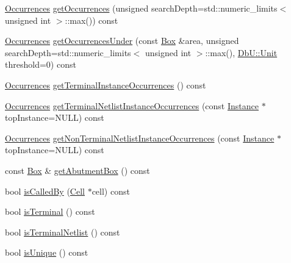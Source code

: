 \begin{DoxyCompactItemize}
\mbox{\hyperlink{namespaceHurricane_a1912927c128eee859af62dbe4cbe0a6b}{Occurrences}} \mbox{\hyperlink{classHurricane_1_1Cell_ab5bbab0a59106855d61deb94805e6115}{get\+Occurrences}} (unsigned search\+Depth=std\+::numeric\+\_\+limits$<$ unsigned int $>$\+::max()) const
\item 
\mbox{\hyperlink{namespaceHurricane_a1912927c128eee859af62dbe4cbe0a6b}{Occurrences}} \mbox{\hyperlink{classHurricane_1_1Cell_aee27efc0497992f811c9812ffa272a5a}{get\+Occurrences\+Under}} (const \mbox{\hyperlink{classHurricane_1_1Box}{Box}} \&area, unsigned search\+Depth=std\+::numeric\+\_\+limits$<$ unsigned int $>$\+::max(), \mbox{\hyperlink{group__DbUGroup_ga4fbfa3e8c89347af76c9628ea06c4146}{Db\+U\+::\+Unit}} threshold=0) const
\item 
\mbox{\hyperlink{namespaceHurricane_a1912927c128eee859af62dbe4cbe0a6b}{Occurrences}} \mbox{\hyperlink{classHurricane_1_1Cell_a30b71d9a35ff4e0b59b98ef515f26fc0}{get\+Terminal\+Instance\+Occurrences}} () const
\item 
\mbox{\hyperlink{namespaceHurricane_a1912927c128eee859af62dbe4cbe0a6b}{Occurrences}} \mbox{\hyperlink{classHurricane_1_1Cell_a6f559f7dab6e4afc0b60eba064c5e474}{get\+Terminal\+Netlist\+Instance\+Occurrences}} (const \mbox{\hyperlink{classHurricane_1_1Instance}{Instance}} $\ast$top\+Instance=N\+U\+LL) const
\item 
\mbox{\hyperlink{namespaceHurricane_a1912927c128eee859af62dbe4cbe0a6b}{Occurrences}} \mbox{\hyperlink{classHurricane_1_1Cell_a9e7a0536ec1efb23be2764068a85b6a7}{get\+Non\+Terminal\+Netlist\+Instance\+Occurrences}} (const \mbox{\hyperlink{classHurricane_1_1Instance}{Instance}} $\ast$top\+Instance=N\+U\+LL) const
\item 
const \mbox{\hyperlink{classHurricane_1_1Box}{Box}} \& \mbox{\hyperlink{classHurricane_1_1Cell_a142360ca7b3c1c637894f5b9a2cac069}{get\+Abutment\+Box}} () const
\item 
bool \mbox{\hyperlink{classHurricane_1_1Cell_a239354e1b4ad9b751abf5a064e43b0e6}{is\+Called\+By}} (\mbox{\hyperlink{classHurricane_1_1Cell}{Cell}} $\ast$cell) const
\item 
bool \mbox{\hyperlink{classHurricane_1_1Cell_aac4e9218b7806f3a0f2d5a55f00abd69}{is\+Terminal}} () const
\item 
bool \mbox{\hyperlink{classHurricane_1_1Cell_a6fe2b5a80d4b344733416b25ea559497}{is\+Terminal\+Netlist}} () const
\item 
bool \mbox{\hyperlink{classHurricane_1_1Cell_a6c2f2fd9f6f6e0578937a90c0c37a507}{is\+Unique}} () const
\item 

\end{DoxyCompactItemize}
